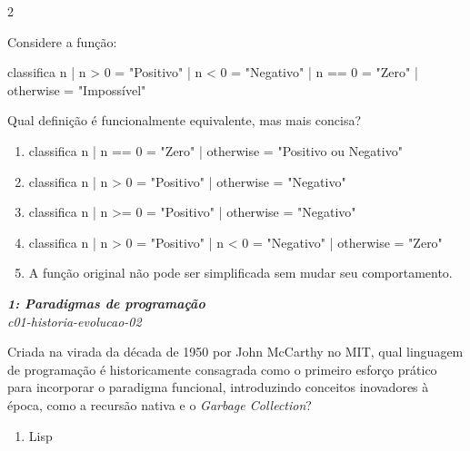 \documentclass[a4paper,10pt,brazil]{article}
\begin{document}
\begin{multicols}{2}
\begin{flushright}
\end{flushright}
Considere a função:
\begin{haskellcode}
classifica n
  | n > 0     = "Positivo"
  | n < 0     = "Negativo"
  | n == 0    = "Zero"
  | otherwise = "Impossível"
\end{haskellcode}
Qual definição é funcionalmente equivalente, mas mais concisa?

\begin{enumerate}
  \item \begin{haskellcode}
classifica n
  | n == 0    = "Zero"
  | otherwise = "Positivo ou Negativo"
\end{haskellcode}

  \item \begin{haskellcode}
classifica n
  | n > 0     = "Positivo"
  | otherwise = "Negativo"
\end{haskellcode}

  \item \begin{haskellcode}
classifica n
  | n >= 0    = "Positivo"
  | otherwise = "Negativo"
\end{haskellcode}

  \item \begin{haskellcode}
classifica n
  | n > 0     = "Positivo"
  | n < 0     = "Negativo"
  | otherwise = "Zero"
\end{haskellcode}

  \item A função original não pode ser simplificada sem mudar seu comportamento.


\end{enumerate}

\begin{flushright}
  \footnotesize
  \textit{\textbf{1: Paradigmas de programação}}\\
  \textit{c01-historia-evolucao-02}\\

\end{flushright}
Criada na virada da década de 1950 por John McCarthy no MIT, qual linguagem de programação é historicamente consagrada como o primeiro esforço prático para incorporar o paradigma funcional, introduzindo conceitos inovadores à época, como a recursão nativa e o \emph{Garbage Collection}?

\begin{enumerate}
  \item Lisp


\end{enumerate}
\end{multicols}
\end{document}
